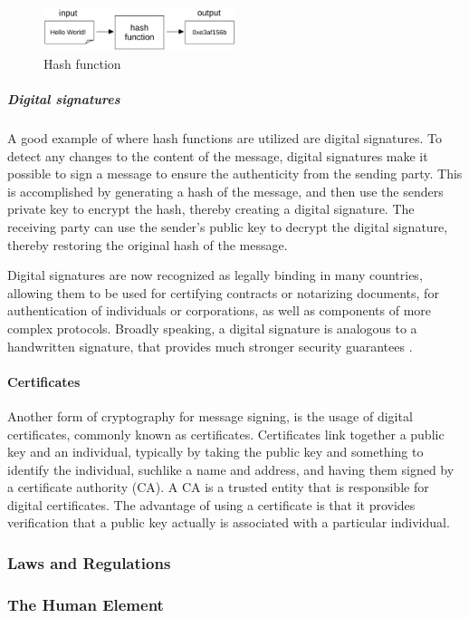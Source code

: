 \begin{figure}[!h]
    \centering
    \includegraphics[width=0.5\textwidth]{../../img/chapter_2/hash-functions.jpg}
    \caption{Hash function}\label{fig:hash}
\end{figure}

\subparagraph{Digital signatures}
A good example of where hash functions are utilized are digital signatures. To detect any changes to the content of the message, digital signatures make it possible to sign a message to ensure the authenticity from the sending party. This is accomplished by generating a hash of the message, and then use the senders private key to encrypt the hash, thereby creating a digital signature. The receiving party can use the sender's public key to decrypt the digital signature, thereby restoring the original hash of the message.

Digital signatures are now recognized as legally binding in many countries, allowing them to be used for certifying contracts or notarizing documents, for authentication of individuals or corporations, as well as components of more complex protocols. Broadly speaking, a digital signature is analogous to a handwritten signature, that provides much stronger security guarantees \cite{katz2010digital}. 

\paragraph{Certificates}
Another form of cryptography for message signing, is the usage of digital certificates, commonly known as certificates. Certificates link together a public key and an individual, typically by taking the public key and something to identify the individual, suchlike a name and address, and having them signed by a certificate authority (CA). A CA is a trusted entity that is responsible for digital certificates. The advantage of using a certificate is that it provides verification that a public key actually is associated with a particular individual.

\subsubsection{Laws and Regulations}

\subsubsection{The Human Element}

